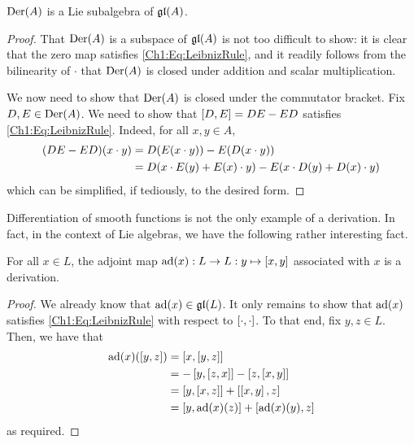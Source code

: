 \begin{boxproposition}\label{Ch1:Prop:DerLieSubalg}
    $\operatorname{Der}\!\left( A \right)$ is a Lie subalgebra of $\mathfrak{gl}\!\left( A \right)$.
\end{boxproposition}
\begin{proof}
    That $\operatorname{Der}\!\left( A \right)$ is a subspace of $\mathfrak{gl}\!\left( A \right)$ is not too difficult to show: it is clear that the zero map satisfies \eqref{Ch1:Eq:LeibnizRule}, and it readily follows from the bilinearity of $\cdot$ that $\operatorname{Der}\!\left( A \right)$ is closed under addition and scalar multiplication.

    We now need to show that $\operatorname{Der}\!\left( A \right)$ is closed under the commutator bracket. Fix $D, E \in \operatorname{Der}\!\left( A \right)$. We need to show that $\left[ D, E \right] = DE - ED$ satisfies \eqref{Ch1:Eq:LeibnizRule}. Indeed, for all $x, y \in A$,
    \begin{align*}
        \left( DE - ED \right)\!(x \cdot y)
        &= D\!\left( E(x \cdot y) \right) - E\!\left( D(x \cdot y) \right) \\
        &= D\!\left( x \cdot E(y) + E(x) \cdot y \right) - E\!\left( x \cdot D(y) + D(x) \cdot y \right) 
    \end{align*}
    which can be simplified, if tediously, to the desired form.
\end{proof}

Differentiation of smooth functions is not the only example of a derivation. In fact, in the context of Lie algebras, we have the following rather interesting fact.

\begin{boxproposition}\label{Ch1:Prop:ad_mem_Der}
    For all $x \in L$, the adjoint map $\operatorname{ad}\!\left( x \right) : L \to L : y \mapsto \left[ x, y \right]$ associated with $x$ is a derivation.
\end{boxproposition}
\begin{proof}
    We already know that $\operatorname{ad}\!\left( x \right) \in \mathfrak{gl}\!\left( L \right)$. It only remains to show that $\operatorname{ad}\!\left( x \right)$ satisfies \eqref{Ch1:Eq:LeibnizRule} with respect to $\left[ \cdot, \cdot \right]$. To that end, fix $y, z \in L$. Then, we have that
    \begin{align*}
        \operatorname{ad}\!\left( x \right)\!\left( \left[ y, z \right] \right)
        &= \left[ x, \left[ y, z \right] \right] \\
        &= - \left[ y, \left[ z, x \right] \right] - \left[ z, \left[ x, y \right] \right] \\
        &= \left[ y, \left[ x, z \right] \right] + \left[ \left[ x, y \right], z \right] \\
        &= \left[ y, \operatorname{ad}\!\left( x \right)\!(z) \right] + \left[ \operatorname{ad}\!\left( x \right)\!(y), z \right]
    \end{align*}
    as required.
\end{proof}

